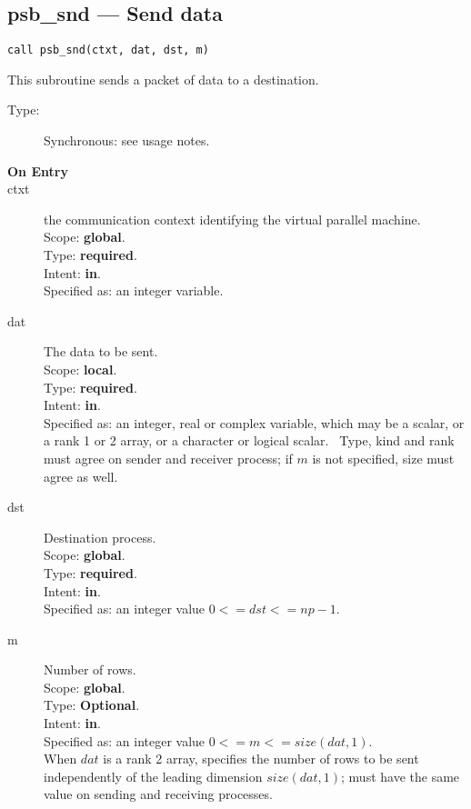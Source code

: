\clearpage\subsection{psb\_snd --- Send data}

\begin{verbatim}
call psb_snd(ctxt, dat, dst, m)
\end{verbatim}

This subroutine sends a packet of data to a destination.
\begin{description}
\item[Type:] Synchronous: see usage notes. 
\item[\bf  On Entry ]
\item[ctxt] the communication context identifying the virtual
  parallel machine.\\
Scope: {\bf global}.\\
Type: {\bf required}.\\
Intent: {\bf in}.\\
Specified as: an integer variable.
\item[dat] The data to be sent.\\
Scope: {\bf local}.\\
Type: {\bf required}.\\
Intent: {\bf in}.\\
Specified as: an integer, real or complex variable, which may be a
scalar, or a rank 1 or 2 array, or a character or logical scalar. \
Type, kind and  rank must agree on sender and receiver process; if $m$ is
not specified, size must agree as well. 
\item[dst] Destination process.\\
Scope: {\bf global}.\\
Type: {\bf required}.\\
Intent: {\bf in}.\\
Specified as: an integer value $0<= dst <= np-1$. \\
\item[m] Number of rows.\\
Scope: {\bf global}.\\
Type: {\bf Optional}.\\
Intent: {\bf in}.\\
Specified as: an integer value $0<= m <= size(dat,1)$. \\
When $dat$ is a rank 2 array, specifies the number of rows to be sent
independently of the leading dimension $size(dat,1)$; must have the
same value on sending and receiving processes.
\end{description}


